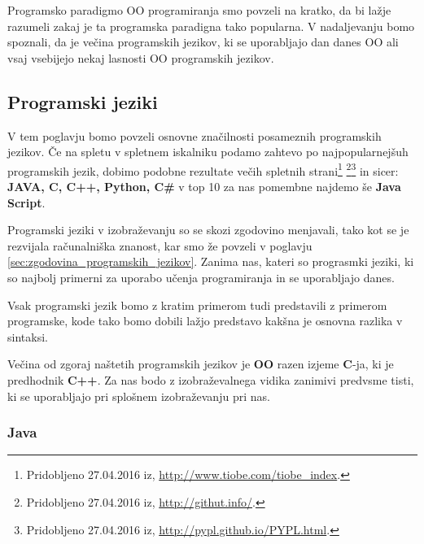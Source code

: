 Programsko paradigmo OO programiranja smo povzeli na kratko, da bi
lažje razumeli zakaj je ta programska paradigna tako popularna. V
nadaljevanju bomo spoznali, da je večina programskih jezikov, ki se
uporabljajo dan danes OO ali vsaj vsebijejo nekaj lasnosti OO
programskih jezikov.

\subsection{Programski jeziki}
\label{sec:programski_jeziki}

V tem poglavju bomo povzeli osnovne značilnosti posameznih programskih
jezikov.  Če na spletu v spletnem iskalniku podamo zahtevo
po najpopularnejšuh programskih jezik, dobimo podobne rezultate
večih spletnih strani\footnote{Pridobljeno 27.04.2016 iz,
  \url{http://www.tiobe.com/tiobe_index}.}  \footnote{Pridobljeno
  27.04.2016 iz, \url{http://githut.info/}.}\footnote{Pridobljeno
  27.04.2016 iz, \url{http://pypl.github.io/PYPL.html}.}  in sicer: \textbf{JAVA,
  C, C++, Python, C\#} v top 10 za nas pomembne najdemo še
\textbf{Java Script}. %

Programski jeziki v izobraževanju so se skozi zgodovino menjavali,
tako kot se je rezvijala računalniška znanost, kar smo že povzeli v
poglavju \ref{sec:zgodovina_programskih_jezikov}. Zanima nas, kateri so
prograsmki jeziki, ki so najbolj primerni za uporabo učenja
programiranja in se uporabljajo danes.

Vsak programski jezik bomo z kratim primerom tudi predstavili z
primerom programske, kode tako bomo dobili lažjo predstavo kakšna je
osnovna razlika v sintaksi.

Večina od zgoraj naštetih programskih jezikov je \textbf{OO} razen
izjeme \textbf{C}-ja, ki je predhodnik \textbf{C++}.  Za nas bodo z
izobraževalnega vidika zanimivi predvsme tisti, ki se uporabljajo pri
splošnem izobraževanju pri nas.




\subsubsection{Java}
\label{sec:pj:JAVA}

